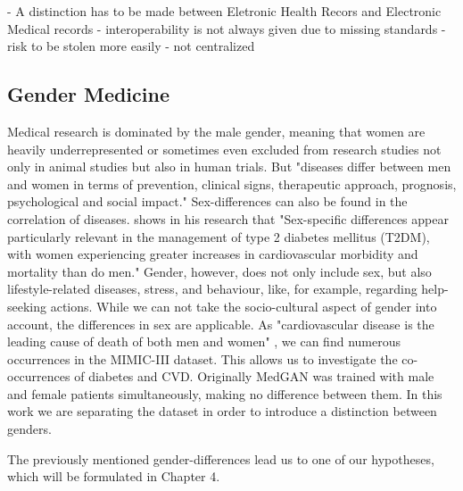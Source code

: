 \documentclass[11pt, a4paper]{book}
\begin{document}
- A distinction has to be made between Eletronic Health Recors and Electronic Medical records
- interoperability is not always given due to missing standards
- risk to be stolen more easily
- not centralized 


\subsection{Gender Medicine}
Medical research is dominated by the male gender, meaning that women are heavily underrepresented or sometimes even excluded from research studies not only in animal studies but also in human trials. \cite{baggio2013gender} 
But "diseases  differ  between  men  and  women  in  terms  of  prevention,  clinical  signs,  therapeutic  approach,  prognosis,  psychological  and  social  impact." \cite{baggio2013gender}
Sex-differences can also be found in the correlation of diseases. \cite{kautzky2010sex} shows in his research that "Sex-specific differences appear particularly relevant in the management of type 2 diabetes mellitus (T2DM), with women experiencing greater increases in cardiovascular morbidity and mortality than do men." \cite{kautzky2010sex}
Gender, however, does not only include sex, but also lifestyle-related diseases, stress, and behaviour, like, for example, regarding help-seeking actions.
While we can not take the socio-cultural aspect of gender into account, the differences in sex are applicable.
As "cardiovascular disease is the leading cause of death of both men and women" \cite{arain2009sex}, we can find numerous occurrences in the MIMIC-III dataset. This allows us to investigate the co-occurrences of diabetes and CVD.
Originally MedGAN was trained with male and female patients simultaneously, making no difference between them. In this work we are separating the dataset in order to introduce a distinction between genders.

The previously mentioned gender-differences lead us to one of our hypotheses, which will be formulated in Chapter 4.
\end{document}
